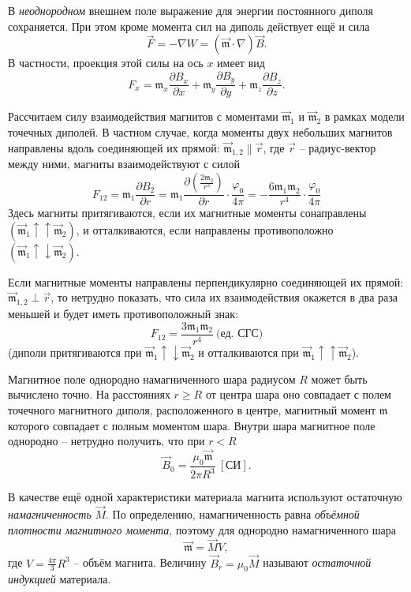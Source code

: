 \documentclass[a4paper,12pt]{article}
\begin{document}
В \textit{неоднородном} внешнем поле выражение для энергии постоянного диполя сохраняется. При этом кроме момента сил на диполь действует ещё и сила\[\vec{F}=-\nabla W=\left(\vec{\mathfrak{m}}\cdot\nabla\right)\vec{B}.\]В частности, проекция этой силы на ось $x$ имеет вид\[F_x=\mathfrak{m}_x\frac{\partial B_x}{\partial x}+\mathfrak{m}_y\frac{\partial B_y}{\partial y}+\mathfrak{m}_z\frac{\partial B_z}{\partial z}.\]

Рассчитаем силу взаимодействия магнитов с моментами $\vec{\mathfrak{m}}_1$ и $\vec{\mathfrak{m}}_2$ в рамках модели точечных диполей. В частном случае, когда моменты двух небольших магнитов направлены вдоль соединяющей их прямой: $\vec{\mathfrak{m}}_{1,2}\parallel\vec{r}$, где $\vec{r}$ -- радиус-вектор между ними, магниты взаимодействуют с силой\[F_{12}=\mathfrak{m}_1\frac{\partial B_2}{\partial r}=\mathfrak{m}_1\frac{\partial\left(\frac{2\mathfrak{m}_2}{r^3}\right)}{\partial r}  \cdot \frac{\varphi_0}{4\pi} = -\frac{6\mathfrak{m}_1\mathfrak{m}_2}{r^4} \cdot \frac{\varphi_0}{4\pi}\]Здесь магниты притягиваются, если их магнитные моменты сонаправлены $(\vec{\mathfrak{m}}_1\uparrow\uparrow\vec{\mathfrak{m}}_2)$, и отталкиваются, если направлены противоположно $(\vec{\mathfrak{m}}_1\uparrow\downarrow\vec{\mathfrak{m}}_2)$.

Если магнитные моменты направлены перпендикулярно соединяющей их прямой: $\vec{\mathfrak{m}}_{1,2}\perp\vec{r}$, то нетрудно показать, что сила их взаимодействия окажется в два раза меньшей и будет иметь противоположный знак:\[F_{12}=\frac{3\mathfrak{m}_1\mathfrak{m}_2}{r^4}\ \text{(ед. СГС)}\](диполи притягиваются при $\vec{\mathfrak{m}}_1\uparrow\downarrow\vec{\mathfrak{m}}_2$ и отталкиваются при $\vec{\mathfrak{m}}_1\uparrow\uparrow\vec{\mathfrak{m}}_2$).

Магнитное поле однородно намагниченного шара радиусом $R$ может быть вычислено точно. На расстояниях $r\geq R$ от центра шара оно совпадает с полем точечного магнитного диполя, расположенного в центре, магнитный момент $\mathfrak{m}$ которого совпадает с полным моментом шара. Внутри шара магнитное поле однородно -- нетрудно получить, что при $r < R$\[\vec{B}_0=\frac{\mu_0\vec{\mathfrak{m}}}{2\pi R^3}\ \left[\text{СИ}\right].\]

В качестве ещё одной характеристики материала магнита используют остаточную \textit{намагниченность} $\vec{M}$. По определению, намагниченность равна \textit{объёмной плотности магнитного момента}, поэтому для однородно намагниченного шара\[\vec{\mathfrak{m}}=\vec{M}V,\]где $V=\frac{4\pi}{3}R^3$ -- объём магнита. Величину $\vec{B}_r=\mu_0\vec{M}$ называют \textit{остаточной индукцией} материала.
\end{document}
